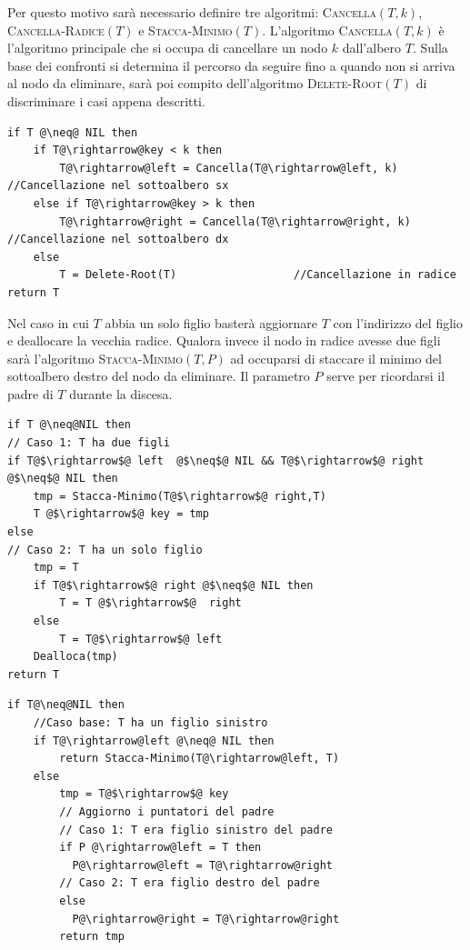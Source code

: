 Per questo motivo sarà necessario definire tre algoritmi: \textsc{Cancella}$(T,k)$, \textsc{Cancella-Radice}$(T)$ e \textsc{Stacca-Minimo}$(T)$. L'algoritmo \textsc{Cancella}$(T,k)$ è l'algoritmo principale che si occupa di cancellare un nodo $k$ dall'albero $T$. Sulla base dei confronti si determina il percorso da seguire fino a quando non si arriva al nodo da eliminare, sarà poi compito dell'algoritmo \textsc{Delete-Root}$(T)$ di discriminare i casi appena descritti.

\begin{lstlisting}[language=asd,caption={\textsc{Cancella}(T,k)},label=lst:delete]
if T @\neq@ NIL then
	if T@\rightarrow@key < k then
		T@\rightarrow@left = Cancella(T@\rightarrow@left, k)					//Cancellazione nel sottoalbero sx
	else if T@\rightarrow@key > k then
		T@\rightarrow@right = Cancella(T@\rightarrow@right, k)			//Cancellazione nel sottoalbero dx
	else
		T = Delete-Root(T)				    //Cancellazione in radice
return T
\end{lstlisting}

Nel caso in cui $T$ abbia un solo figlio basterà aggiornare $T$ con l'indirizzo del figlio e deallocare la vecchia radice.  Qualora invece il nodo in radice avesse due figli sarà l'algoritmo \textsc{Stacca-Minimo}$(T,P)$ ad occuparsi di staccare il minimo del sottoalbero destro del nodo da eliminare. Il parametro $P$ serve per ricordarsi il padre di $T$ durante la discesa.

\begin{lstlisting}[language=asd,caption={\textsc{Delete-Root}(T)},label=lst:delete-root]
if T @\neq@NIL then
// Caso 1: T ha due figli
if T@$\rightarrow$@ left  @$\neq$@ NIL && T@$\rightarrow$@ right  @$\neq$@ NIL then
 	tmp = Stacca-Minimo(T@$\rightarrow$@ right,T)
 	T @$\rightarrow$@ key = tmp
else
// Caso 2: T ha un solo figlio
 	tmp = T
 	if T@$\rightarrow$@ right @$\neq$@ NIL then
 		T = T @$\rightarrow$@  right
 	else
 		T = T@$\rightarrow$@ left
 	Dealloca(tmp)
return T
\end{lstlisting}


\begin{lstlisting}[language=asd,caption={\textsc{Stacca-Minimo}(T,P)},label=lst:delete-min]
if T@\neq@NIL then
	//Caso base: T ha un figlio sinistro
	if T@\rightarrow@left @\neq@ NIL then
		return Stacca-Minimo(T@\rightarrow@left, T)
	else
		tmp = T@$\rightarrow$@ key
		// Aggiorno i puntatori del padre
		// Caso 1: T era figlio sinistro del padre
		if P @\rightarrow@left = T then
		  P@\rightarrow@left = T@\rightarrow@right
		// Caso 2: T era figlio destro del padre
		else
		  P@\rightarrow@right = T@\rightarrow@right
		return tmp
\end{lstlisting}

